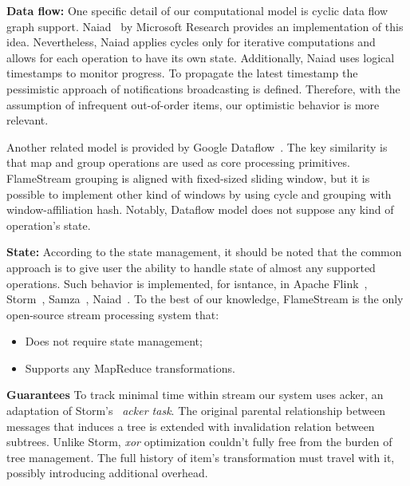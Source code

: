
\label {fs-related-section}

{\bf Data flow:}
One specific detail of our computational model is cyclic data flow graph support. Naiad~\cite{Murray:2013:NTD:2517349.2522738} by Microsoft Research provides an implementation of this idea. Nevertheless, Naiad applies cycles only for iterative computations and allows for each operation to have its own state. Additionally, Naiad uses logical timestamps to monitor progress. To propagate the latest timestamp the pessimistic approach of notifications broadcasting is defined. Therefore, with the assumption of infrequent out-of-order items, our optimistic behavior is more relevant.

Another related model is provided by Google Dataflow~\cite{Akidau:2015:DMP:2824032.2824076}. The key similarity is that map and group operations are used as core processing primitives. FlameStream grouping is aligned with fixed-sized sliding window, but it is possible to implement other kind of windows by using cycle and grouping with window-affiliation hash. Notably, Dataflow model does not suppose any kind of operation's state.

{\bf State:}
According to the state management, it should be noted that the common approach is to give user the ability to handle state of almost any supported operations. Such behavior is implemented, for isntance, in Apache Flink~\cite{carbone2015apache}, Storm~\cite{apache:storm}, Samza~\cite{Noghabi:2017:SSS:3137765.3137770}, Naiad~\cite{Murray:2013:NTD:2517349.2522738}.
To the best of our knowledge, FlameStream is the only open-source stream processing system that:
\begin{itemize}
    \item Does not require state management;
    \item Supports any MapReduce transformations. 
\end{itemize}

{\bf Guarantees}
To track minimal time within stream our system uses acker, an adaptation of Storm's~\cite{apache:storm} {\it acker task}. The original parental relationship between messages that induces a tree is extended with invalidation relation between subtrees. Unlike Storm, {\it xor} optimization couldn't fully free from the burden of tree management. The full history of item's transformation must travel with it, possibly introducing additional overhead.
